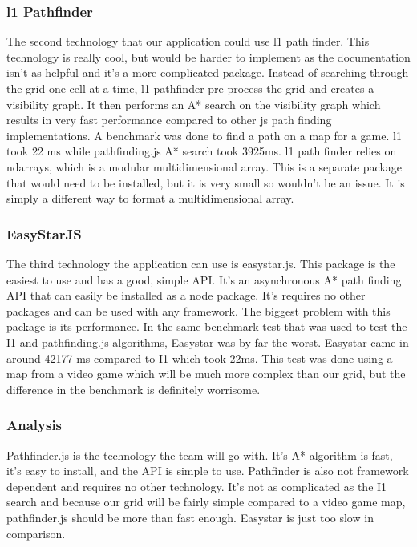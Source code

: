 \documentclass[letterpaper,10pt,titlepage, onecolumn, compsoc]{IEEEtran}
\begin{document}
\subsubsection{l1 Pathfinder}
The second technology that our application could use l1 path finder. This technology is really cool, but would be harder to implement as the documentation isn’t as helpful and it’s a more complicated package. Instead of searching through the grid one cell at a time, l1 pathfinder pre-process the grid and creates a visibility graph. It then performs an A* search on the visibility graph which results in very fast performance compared to other js path finding implementations. A benchmark was done to find a path on a map for a game. l1 took 22 ms while pathfinding.js A* search took 3925ms. l1 path finder relies on ndarrays, which is a modular multidimensional array. This is a separate package that would need to be installed, but it is very small so wouldn’t be an issue. It is simply a different way to format a multidimensional array.\cite{l1}
 

\subsubsection{EasyStarJS}
The third technology the application can use is easystar.js. This package is the easiest to use and has a good, simple API. It’s an asynchronous A* path finding API that can easily be installed as a node package. It’s requires no other packages and can be used with any framework. The biggest problem with this package is its performance. In the same benchmark test that was used to test the I1 and pathfinding.js algorithms, Easystar was by far the worst.  Easystar came in around 42177 ms compared to I1 which took 22ms. This test was done using a map from a video game which will be much more complex than our grid, but the difference in the benchmark is definitely worrisome. 
\cite{Easystar}

\subsubsection{Analysis}
Pathfinder.js is the technology the team will go with. It’s A* algorithm is fast, it’s easy to install, and the API is simple to use. Pathfinder is also not framework dependent and requires no other technology.  It’s not as complicated as the I1 search and because our grid will be fairly simple compared to a video game map, pathfinder.js should be more than fast enough. Easystar is just too slow in comparison. 
\end{document}
